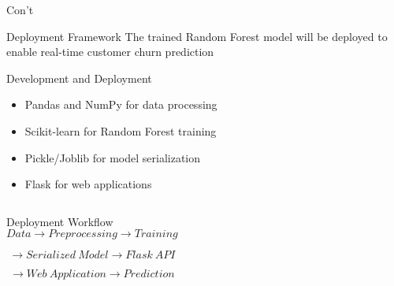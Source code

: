 \documentclass[10pt]{beamer}
\begin{document}
\begin{frame}{Con't}
	
	\small
	
	\begin{block}{Deployment Framework}
		The trained Random Forest model will be deployed  to enable real-time customer churn prediction
	\end{block}
	
	\vspace{0.0003cm}
	

		
		\begin{exampleblock}{Development and Deployment}
			\begin{itemize}
								
				\item Pandas and NumPy for data processing
				\item Scikit-learn for Random Forest training
				\item Pickle/Joblib for model serialization
				\item Flask for web applications
				
				
			\end{itemize}
		\end{exampleblock}
	\begin{columns}
	
		
		\begin{exampleblock}{Deployment Workflow}
			\[
			Data \rightarrow Preprocessing \rightarrow Training
			\]
			
			\[
			\rightarrow Serialized\ Model \rightarrow Flask\ API
			\]
			
			\[
			\rightarrow Web\ Application \rightarrow Prediction
			\]
		\end{exampleblock}
		
	\end{columns}
	\vspace{0.3cm}
\end{frame}

\vspace{0.3cm}
\end{document}
